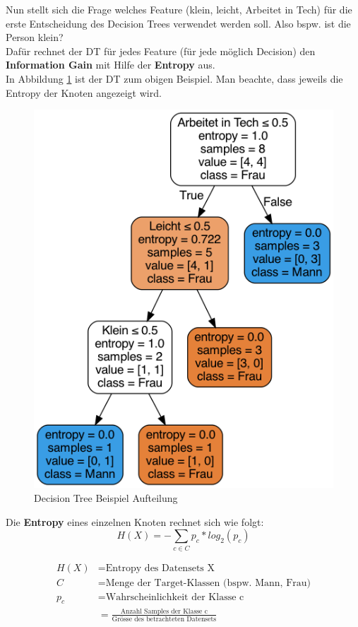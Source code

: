 Nun stellt sich die Frage welches Feature (klein, leicht, Arbeitet in Tech) für die erste Entscheidung des Decision Trees verwendet werden soll. Also bspw. ist die Person klein? \\

Dafür rechnet der DT für jedes Feature (für jede möglich Decision) den \textbf{Information Gain} mit Hilfe der \textbf{Entropy} aus. \\

In Abbildung \ref{fig:dt_split} ist der DT zum obigen Beispiel. Man beachte, dass jeweils die Entropy der Knoten angezeigt wird.


\newpage
\begin{figure}[h!]
	\includegraphics[scale=0.6]{figures/decision_tree_ex1}
	\caption{Decision Tree Beispiel Aufteilung}
	\label{fig:dt_split}
\end{figure}

Die \textbf{Entropy} eines einzelnen Knoten rechnet sich wie folgt:
$$ H(X) = - \sum_{c \in C} p_{c} * log_{2}(p_{c}) $$

\begin{align*}
	H(X) &= \text{Entropy des Datensets X} \\
	C &= \text{Menge der Target-Klassen (bspw. {Mann, Frau})} \\
	p_{c} &= \text{Wahrscheinlichkeit der Klasse c} \\
	      &= \frac{\text{Anzahl Samples der Klasse c}}{\text{Grösse des betrachteten Datensets}}  \\
\end{align*}

